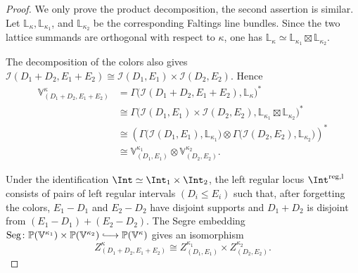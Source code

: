 \documentclass{amsart}
\numberwithin{equation}{section}
\numberwithin{figure}{section}
\theoremstyle{definition}
\theoremstyle{remark}
\renewcommand{\c}[1]{\mathcal{#1}}
\begin{document}
\begin{proof}
	We only prove the product decomposition, the second assertion is similar.
	Let $\mathbb L_\kappa,\mathbb L_{\kappa_1}$, and
	$\mathbb L_{\kappa_2}$ be the corresponding Faltings line bundles.
	Since the two lattice summands are orthogonal with respect to $\kappa$, one has
	$\mathbb L_\kappa\simeq
	\mathbb L_{\kappa_1}\boxtimes\mathbb L_{\kappa_2}$.
	
	The decomposition of the colors also gives $\c I(D_1+D_2,E_1+E_2)
	\cong 	\c I(D_1,E_1)\times\c I(D_2,E_2).$
	Hence
	\begin{align*}
		\mathbb V^\kappa_{(D_1+D_2,E_1+E_2)}
		&=
		\Gamma\bigl(\c I(D_1+D_2,E_1+E_2),\mathbb L_\kappa\bigr)^*\\
		&\cong
		\Gamma\bigl(
		\c I(D_1,E_1)\times\c I(D_2,E_2),
		\mathbb L_{\kappa_1}\boxtimes\mathbb L_{\kappa_2}
		\bigr)^*\\
		&\cong
		\left(
		\Gamma\bigl(\c I(D_1,E_1),\mathbb L_{\kappa_1}\bigr)
		\otimes
		\Gamma\bigl(\c I(D_2,E_2),\mathbb L_{\kappa_2}\bigr)
		\right)^*\\
		&\cong
		\mathbb V^{\kappa_1}_{(D_1,E_1)}
		\otimes
		\mathbb V^{\kappa_2}_{(D_2,E_2)}.
	\end{align*}
	
	Under the identification $\Int\simeq\Int_1\times\Int_2$, the left
	regular locus $\Int^{\mathrm{reg,l}}$ consists of pairs of left regular
	intervals $(D_i\leq E_i)$ such that, after forgetting the colors,
	$E_1-D_1$ and $E_2-D_2$ have disjoint supports and
	$D_1+D_2$ is disjoint from
	$(E_1-D_1)+(E_2-D_2)$. 
	The Segre embedding $\operatorname{Seg}\colon
	\mathbb P(\mathbb V^{\kappa_1})
	\times
	\mathbb P(\mathbb V^{\kappa_2})
	\lhook\joinrel\longrightarrow
	\mathbb P(\mathbb V^\kappa)$ gives an isomorphism	
	\[
	Z^\kappa_{(D_1+D_2,E_1+E_2)}
	\cong
	Z^{\kappa_1}_{(D_1,E_1)}
	\times
	Z^{\kappa_2}_{(D_2,E_2)}.
	\]
\end{proof}
\end{document}
